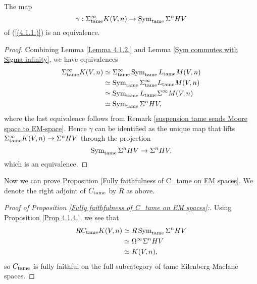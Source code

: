 \begin{proposition}
\label{Prop 4.1.4.}
The map 
$$
\gamma:  \Sigma^{\infty}_{\operatorname{\operatorname{tame}}}K(V,n)\to \operatorname{Sym}_{\operatorname{\operatorname{tame}}} \Sigma^{n}HV
$$
of (\ref{(4.1.1.)}) is an equivalence.
\end{proposition}

\begin{proof}
Combining Lemma \ref{Lemma 4.1.2.} and Lemma \ref{Sym commutes with Sigma infinity}, we have equivalences
\begin{align*}
	\Sigma_{\operatorname{\operatorname{tame}}}^{\infty} K(V,n) 
& \simeq \Sigma_{\operatorname{\operatorname{tame}}}^{\infty} \operatorname{Sym}_{\operatorname{\operatorname{tame}}}L_{\operatorname{\operatorname{tame}}} M(V,n)\\
& \simeq   \operatorname{Sym}_{\operatorname{\operatorname{tame}}} \Sigma_{\operatorname{\operatorname{tame}}}^{\infty}L_{\operatorname{\operatorname{tame}}}M(V,n)\\
& \simeq   \operatorname{Sym}_{\operatorname{\operatorname{tame}}} L_{\operatorname{\operatorname{tame}}} \Sigma^{\infty}M(V,n)\\
& \simeq \operatorname{Sym}_{\operatorname{\operatorname{tame}}} \Sigma^n HV,
\end{align*}
where the last equivalence follows from Remark \ref{suspension tame sends Moore space to EM-space}.
Hence $\gamma$ can be identified as the unique map that lifts $\Sigma^{\infty}_{\operatorname{\operatorname{tame}}}K(V,n) \to \Sigma^n HV$ through the projection
$$
\operatorname{Sym}_{\operatorname{\operatorname{tame}}} \Sigma^n HV \to \Sigma^n HV,
$$
which is an equivalence.
\end{proof}


Now we can prove Proposition \ref{Fully faithfulness of C_tame on EM spaces}. We denote the right adjoint of $C_{\operatorname{\operatorname{tame}}}$ by $R$ as above.
\begin{proof}
[Proof of Proposition \ref{Fully faithfulness of C_tame on EM spaces}:]
Using Proposition \ref{Prop 4.1.4.}, we see that
\begin{align*}
    R C_{\operatorname{\operatorname{tame}}} K(V,n) & \simeq R\operatorname{Sym}_{\operatorname{\operatorname{tame}}}\Sigma^n HV \\
    & \simeq \Omega^\infty \Sigma^n HV\\
    & \simeq K(V,n),
\end{align*}
    so $C_{\operatorname{\operatorname{tame}}}$ is fully faithful on the full subcategory of tame Eilenberg-Maclane spaces.
    
\end{proof}

















